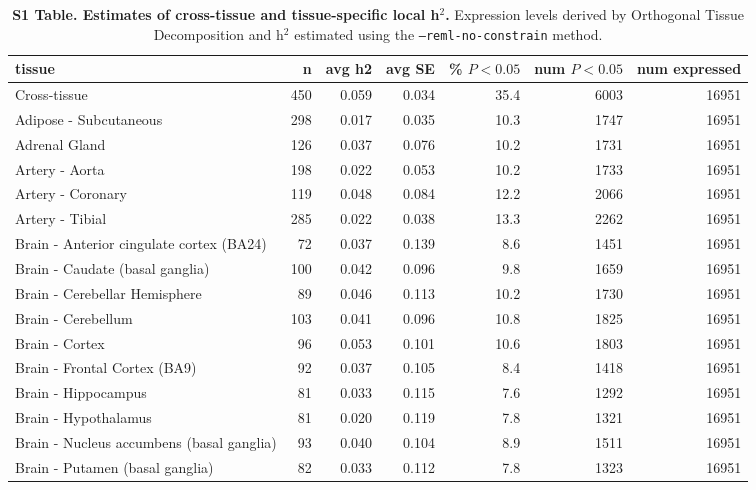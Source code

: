 \documentclass[10pt,letterpaper]{article}
\date{}
\begin{document}
\vspace*{0.35in}


\begin{table}[!ht]
\begin{adjustwidth}{-2.25in}{0in} %
\caption*{{\bf S1 Table. Estimates of cross-tissue and tissue-specific local h$^2$.} Expression levels derived by Orthogonal Tissue Decomposition and h$^2$ estimated using the \texttt{--reml-no-constrain} method.}
\centering
\begin{tabular}{lrrrrrr}
  \hline
tissue & n & avg h2 & avg SE & \% $P<0.05$ & num $P<0.05$ & num expressed \\ 
  \hline
Cross-tissue & 450 & 0.059 & 0.034 & 35.4 & 6003 & 16951 \\ 
  Adipose - Subcutaneous & 298 & 0.017 & 0.035 & 10.3 & 1747 & 16951 \\ 
  Adrenal Gland & 126 & 0.037 & 0.076 & 10.2 & 1731 & 16951 \\ 
  Artery - Aorta & 198 & 0.022 & 0.053 & 10.2 & 1733 & 16951 \\ 
  Artery - Coronary & 119 & 0.048 & 0.084 & 12.2 & 2066 & 16951 \\ 
  Artery - Tibial & 285 & 0.022 & 0.038 & 13.3 & 2262 & 16951 \\ 
  Brain - Anterior cingulate cortex (BA24) & 72 & 0.037 & 0.139 & 8.6 & 1451 & 16951 \\ 
  Brain - Caudate (basal ganglia) & 100 & 0.042 & 0.096 & 9.8 & 1659 & 16951 \\ 
  Brain - Cerebellar Hemisphere & 89 & 0.046 & 0.113 & 10.2 & 1730 & 16951 \\ 
  Brain - Cerebellum & 103 & 0.041 & 0.096 & 10.8 & 1825 & 16951 \\ 
  Brain - Cortex & 96 & 0.053 & 0.101 & 10.6 & 1803 & 16951 \\ 
  Brain - Frontal Cortex (BA9) & 92 & 0.037 & 0.105 & 8.4 & 1418 & 16951 \\ 
  Brain - Hippocampus & 81 & 0.033 & 0.115 & 7.6 & 1292 & 16951 \\ 
  Brain - Hypothalamus & 81 & 0.020 & 0.119 & 7.8 & 1321 & 16951 \\ 
  Brain - Nucleus accumbens (basal ganglia) & 93 & 0.040 & 0.104 & 8.9 & 1511 & 16951 \\ 
  Brain - Putamen (basal ganglia) & 82 & 0.033 & 0.112 & 7.8 & 1323 & 16951 \\ 

\end{tabular}
\end{adjustwidth}
\end{table}
\end{document}
